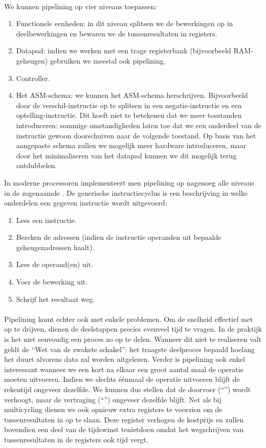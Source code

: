\paragraph{}
We kunnen pipelining op vier niveaus toepassen:
\begin{enumerate}
 \item Functionele eenheden: in dit niveau splitsen we de bewerkingen op in deelbewerkingen en bewaren we de tussenresultaten in registers.
 \item Datapad: indien we werken met een trage registerbank (bijvoorbeeld RAM-geheugen) gebruiken we meestal ook pipelining.
 \item Controller.
 \item Het ASM-schema: we kunnen het ASM-schema herschrijven. Bijvoorbeeld door de verschil-instructie op te splitsen in een negatie-instructie en een optelling-instructie. Dit hoeft niet te betekenen dat we meer toestanden introduceren: sommige omstandigheden laten toe dat we een onderdeel van de instructie gewoon doorschuiven naar de volgende toestand. Op basis van het aangepaste schema zullen we mogelijk meer hardware introduceren, maar door het minimaliseren van het datapad kunnen we dit mogelijk terug ontdubbelen.
\end{enumerate}
In moderne processoren implementeert men pipelining op nagenoeg alle niveaus in de zogenaamde . De generische instructiecyclus is een beschrijving in welke onderdelen een gegeven instructie wordt uitgevoerd:
\begin{enumerate}
 \item Lees een instructie.
 \item Bereken de adressen (indien de instructie operanden uit bepaalde geheugenadressen haalt).
 \item Lees de operand(en) uit.
 \item Voer de bewerking uit.
 \item Schrijf het resultaat weg.
\end{enumerate}
\paragraph{}
Pipelining komt echter ook met enkele problemen. Om de snelheid effectief met  op te drijven, dienen de deelstappen precies evenveel tijd te vragen. In de praktijk is het niet eenvoudig een proces zo op te delen. Wanneer dit niet te realiseren valt geldt de ``Wet van de zwakste schakel'': het traagste deelproces bepaald hoelang het duurt alvorens data zal worden uitgelezen. Verder is pipelining ook enkel interessant wanneer we een kort na elkaar een groot aantal maal de operatie moeten uitvoeren. Indien we slechts \'e\'enmaal de operatie uitvoeren blijft de rekentijd ongeveer dezelfde. We kunnen dus stellen dat de doorvoer (``'') wordt verhoogt, maar de vertraging (``'') ongeveer dezelfde blijft. Net als bij multicycling dienen we ook opnieuw extra registers te voorzien om de tussenresultaten in op te slaan. Deze register verhogen de kostprijs en zullen bovendien een deel van de tijdswinst tenietdoen omdat het wegschrijven van tussenresultaten in de registers ook tijd vergt.

